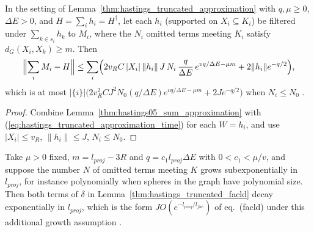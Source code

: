 \begin{lemma}
    \label{thm:hastings_truncated_sum}
    \leanok
    In the setting of Lemma~\ref{thm:hastings_truncated_approximation} with
    $q,\mu\ge0$, $\Delta E>0$, and $H=\sum_ih_i=H^\dagger$, let each $h_i$
    (supported on $X_i\subseteq K_i$) be filtered under $\sum_{k\in s_i}h_k$ to
    $M_i$, where the $N_i$ omitted terms meeting $K_i$ satisfy
    $d_G(X_i,X_k)\ge m$. Then
    \begin{align}
        \Bigl\|\sum_iM_i-H\Bigr\|\le\sum_i\Bigl(2v_RC\,|X_i|\,\|h_i\|\,J\,N_i\,
        \frac{q}{\Delta E}\,e^{vq/\Delta E-\mu m}+2\|h_i\|e^{-q/2}\Bigr),
        \label{eq:hastings_truncated_sum}
    \end{align}
    which is at most $|\{i\}|\bigl(2v_R^2CJ^2N_0(q/\Delta E)e^{vq/\Delta E-\mu m}+2Je^{-q/2}\bigr)$
    when $N_i\le N_0$ \cite[lines 343--374]{Hastings2006Solving}.
\end{lemma}
\begin{proof}
    \leanok
    Combine Lemma~\ref{thm:hastings05_sum_approximation} with
    (\ref{eq:hastings_truncated_approximation_time}) for each $W=h_i$, and use
    $|X_i|\le v_R$, $\|h_i\|\le J$, $N_i\le N_0$.
\end{proof}

\begin{remark}
    Take $\mu>0$ fixed, $m=l_{proj}-3R$ and $q=c_1l_{proj}\Delta E$ with
    $0<c_1<\mu/v$, and suppose the number $N$ of omitted terms meeting $K$
    grows subexponentially in $l_{proj}$, for instance polynomially when spheres
    in the graph have polynomial size. Then both terms of $\delta$ in
    Lemma~\ref{thm:hastings_truncated_facld} decay exponentially in
    $l_{proj}$, which is the form $JO(e^{-l_{proj}/l_{fac}})$ of
    eq.~(facld) under this additional growth assumption
    \cite{gap:hastings05_truncated_dynamics,gap:hastings05_geometric_growth_scope}.
\end{remark}

